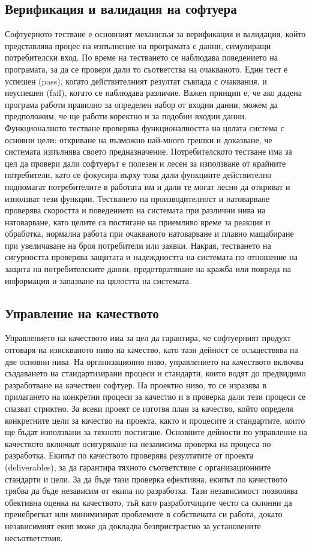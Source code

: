 \documentclass{article}
\renewcommand{\\}{\newline}
\begin{document}
\subsection{Верификация и валидация на софтуера}
Софтуерното тестване е основният механизъм за верификация и валидация, който представлява процес на изпълнение на програмата с данни, симулиращи потребителски вход. По време на тестването се наблюдава поведението на програмата, за да се провери дали то съответства на очакваното. Един тест е успешен (pass), когато действителният резултат съвпада с очаквания, и неуспешен (fail), когато се наблюдава различие. Важен принцип е, че ако дадена програма работи правилно за определен набор от входни данни, можем да предположим, че ще работи коректно и за подобни входни данни. Функционалното тестване проверява функционалността на цялата система с основни цели: откриване на възможно най-много грешки и доказване, че системата изпълнява своето предназначение. Потребителското тестване има за цел да провери дали софтуерът е полезен и лесен за използване от крайните потребители, като се фокусира върху това дали функциите действително подпомагат потребителите в работата им и дали те могат лесно да откриват и използват тези функции. Тестването на производителност и натоварване проверява скоростта и поведението на системата при различни нива на натоварване, като целите са постигане на приемливо време за реакция и обработка, нормална работа при очакваното натоварване и плавно мащабиране при увеличаване на броя потребители или заявки. Накрая, тестването на сигурността проверява защитата и надеждността на системата по отношение на защита на потребителските данни, предотвратяване на кражба или повреда на информация и запазване на цялостта на системата.

\subsection{Управление на качеството}
Управлението на качеството има за цел да гарантира, че софтуерният продукт отговаря на изискваното ниво на качество, като тази дейност се осъществява на две основни нива. На организационно ниво, управлението на качеството включва създаването на стандартизирани процеси и стандарти, които водят до предвидимо разработване на качествен софтуер. На проектно ниво, то се изразява в прилагането на конкретни процеси за качество и в проверка дали тези процеси се спазват стриктно. За всеки проект се изготвя план за качество, който определя конкретните цели за качество на проекта, както и процесите и стандартите, които ще бъдат използвани за тяхното постигане. Основните дейности по управление на качеството включват осигуряване на независима проверка на процеса по разработка. Екипът по качеството проверява резултатите от проекта (deliverables), за да гарантира тяхното съответствие с организационните стандарти и цели. За да бъде тази проверка ефективна, екипът по качеството трябва да бъде независим от екипа по разработка. Тази независимост позволява обективна оценка на качеството, тъй като разработчиците често са склонни да пренебрегват или минимизират проблемите в собствената си работа, докато независимият екип може да докладва безпристрастно за установените несъответствия.
\end{document}
